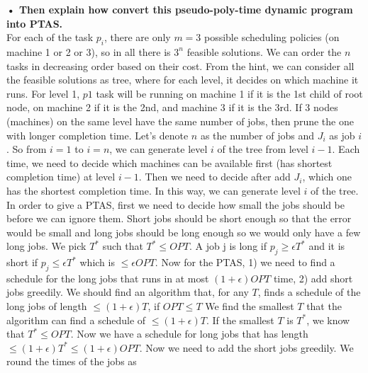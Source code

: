 \documentclass{article}
\begin{document}
\textbf{• Then explain how convert this pseudo-poly-time dynamic program into PTAS.}\\ \newline
For each of the task $p_i$, there are only $m = 3$ possible scheduling policies (on machine 1 or 2 or 3), so in all there is $3^n$ feasible solutions. We can order the $n$ tasks in decreasing order based on their cost. From the hint, we can consider all the feasible solutions as tree, where for each level, it decides on which machine it runs. For level 1, $p1$ task will be running on machine 1 if it is the 1st child of root node, on machine 2 if it is the 2nd, and machine 3 if it is the 3rd. If 3 nodes (machines) on the same level have the same number of jobs, then prune the one with longer completion time. Let's denote $n$ as the number of jobs and $J_i$ as job $i$. So from $i = 1$ to $i = n$, we can generate level $i$ of the tree from level $i - 1$. Each time, we need to decide which machines can be available first (has shortest completion time) at level $i-1$. Then we need to decide after add $J_i$, which one has the shortest completion time. In this way, we can generate level $i$ of the tree.  
\\ \newline
In order to give a PTAS, first we need to decide how small the jobs should be before we can ignore them. Short jobs should be short enough so that the error would be small and long jobs should be long enough so we would only have a few long jobs. We pick $T^*$ such that $T^* \leq OPT$. A job j is long if $p_j \geq \epsilon T^*$ and it is short if  $p_j \leq \epsilon T^*$ which is $\leq \epsilon OPT$. Now for the PTAS, 1) we need to find a schedule for the long jobs that runs in at most $(1 + \epsilon)OPT$ time, 2) add short jobs greedily. We should find an algorithm that, for any $T$, finds a schedule of the long jobs of length $\leq (1 + \epsilon)T$, if $OPT \leq T$ We find the smallest $T$ that the algorithm can find a schedule of $\leq (1 + \epsilon)T$. If the smallest $T$ is $T^*$, we know that $T^* \leq OPT$. Now we have a schedule for long jobs that has length $\leq (1 + \epsilon)T^* \leq (1 + \epsilon)OPT$. Now we need to add the short jobs greedily. We round the times of the jobs as
\end{document}
